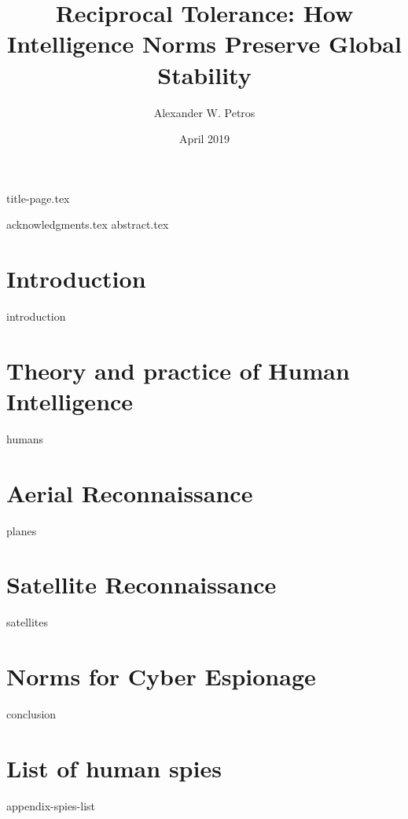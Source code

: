 \documentclass[11pt]{memoir}
\title{Reciprocal Tolerance: How Intelligence Norms Preserve Global Stability}
\author{Alexander W. Petros}
\date{April 2019}
\begin{document}
    \frontmatter
    {title-page.tex}

    \tableofcontents
    \newpage
    \thispagestyle{empty}

    \listoffigures
    \listoftables

    {acknowledgments.tex}
    {abstract.tex}


    \mainmatter
    \chapter{Introduction}
    {introduction}

    \chapter{Theory and practice of Human Intelligence}
    {humans}

    \chapter{Aerial Reconnaissance}
    {planes}

    \chapter{Satellite Reconnaissance}
    {satellites}

    \chapter{Norms for Cyber Espionage}
    {conclusion}


    \appendix
    \chapter{List of human spies}
    {appendix-spies-list}
\end{document}
